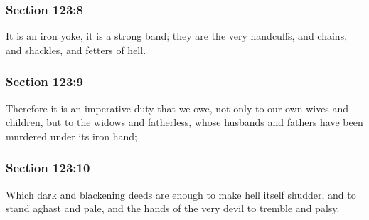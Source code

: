 	\subsubsection{Section 123:8} %
		\label{DC123-8}

		It is an iron yoke, it is a strong band; they are the very handcuffs, and chains, and shackles, and fetters of hell.


	\subsubsection{Section 123:9} %
		\label{DC123-9}

		Therefore it is an imperative duty that we owe, not only to our own wives and children, but to the widows and fatherless, whose husbands and fathers have been murdered under its iron hand;


	\subsubsection{Section 123:10} %
		\label{DC123-10}

		Which dark and blackening deeds are enough to make hell itself shudder, and to stand aghast and pale, and the hands of the very devil to tremble and palsy.


